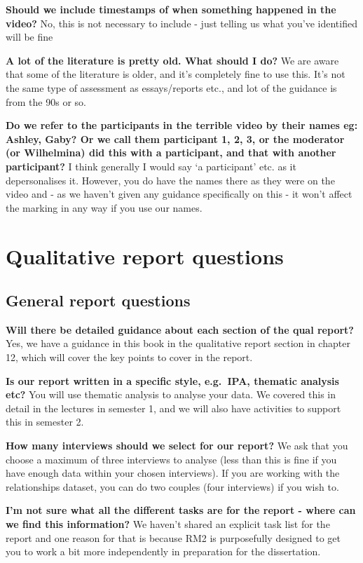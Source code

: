 \documentclass[
  english,
  letterpaper,
  DIV=11,
  numbers=noendperiod]{scrreprt}
\begin{document}
\textbf{Should we include timestamps of when something happened in the
video?} No, this is not necessary to include - just telling us what
you've identified will be fine

\textbf{A lot of the literature is pretty old. What should I do?} We are
aware that some of the literature is older, and it's completely fine to
use this. It's not the same type of assessment as essays/reports etc.,
and lot of the guidance is from the 90s or so.

\textbf{Do we refer to the participants in the terrible video by their
names eg: Ashley, Gaby? Or we call them participant 1, 2, 3, or the
moderator (or Wilhelmina) did this with a participant, and that with
another participant?} I think generally I would say `a participant' etc.
as it depersonalises it. However, you do have the names there as they
were on the video and - as we haven't given any guidance specifically on
this - it won't affect the marking in any way if you use our names.

\section{Qualitative report
questions}\label{qualitative-report-questions}

\subsection{General report questions}\label{general-report-questions}

\textbf{Will there be detailed guidance about each section of the qual
report?} Yes, we have a guidance in this book in the qualitative report
section in chapter 12, which will cover the key points to cover in the
report.

\textbf{Is our report written in a specific style, e.g.~IPA, thematic
analysis etc?} You will use thematic analysis to analyse your data. We
covered this in detail in the lectures in semester 1, and we will also
have activities to support this in semester 2.

\textbf{How many interviews should we select for our report?} We ask
that you choose a maximum of three interviews to analyse (less than this
is fine if you have enough data within your chosen interviews). If you
are working with the relationships dataset, you can do two couples (four
interviews) if you wish to.

\textbf{I'm not sure what all the different tasks are for the report -
where can we find this information?} We haven't shared an explicit task
list for the report and one reason for that is because RM2 is
purposefully designed to get you to work a bit more independently in
preparation for the dissertation.
\end{document}

